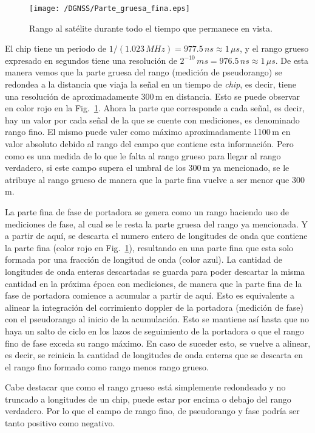 \documentclass[a4paper,12pt,oneside,onecolumn,final,openright]{book}%
\begin{document}
\begin{figure}
    \centering
    \texttt{[image: /DGNSS/Parte\_gruesa\_fina.eps]}
    \caption{Rango al satélite durante todo el tiempo que permanece en vista.}
    \label{fig:rrng_frng}
\end{figure}
	
	El chip tiene un periodo de $1/(1.023\,MHz) = 977.5\,ns \approx 1\,\mu s$, y el rango grueso expresado en segundos tiene una resolución de $2^{-10}\,ms = 976.5\,ns \approx 1\, \mu s$. De esta manera vemos que la parte gruesa del rango (medición de pseudorango) se redondea a la distancia que viaja la señal en un tiempo de \textit{chip}, es decir, tiene una resolución de aproximadamente 300\,m en distancia. Esto se puede observar en color rojo en la Fig.~\ref{fig:rrng_frng}. Ahora la parte que corresponde a cada señal, es decir, hay un valor por cada señal de la que se cuente con mediciones, es denominado rango fino. El mismo puede valer como máximo aproximadamente 1100\,m en valor absoluto debido al rango del campo que contiene esta información. Pero como es una medida de lo que le falta al rango grueso para llegar al rango verdadero, si este campo supera el umbral de los 300\,m ya mencionado, se le atribuye al rango grueso de manera que la parte fina vuelve a ser menor que 300\,m.
	
	La parte fina de fase de portadora se genera como un rango haciendo uso de mediciones de fase, al cual se le resta la parte gruesa del rango ya mencionada. Y a partir de aquí, se descarta el numero entero de longitudes de onda que contiene la parte fina (color rojo en Fig.~\ref{fig:rrng_frng}), resultando en una parte fina que esta solo formada por una fracción de longitud de onda (color azul). La cantidad de longitudes de onda enteras descartadas se guarda para poder descartar la misma cantidad en la próxima época con mediciones, de manera que la parte fina de la fase de portadora comience a acumular a partir de aquí. Esto es equivalente a alinear la integración del corrimiento doppler de la portadora (medición de fase) con el pseudorango al inicio de la acumulación. Esto se mantiene así hasta que no haya un salto de ciclo en los lazos de seguimiento de la portadora o que el rango fino de fase exceda su rango máximo. En caso de suceder esto, se vuelve a alinear, es decir, se reinicia la cantidad de longitudes de onda enteras que se descarta en el rango fino formado como rango menos rango grueso. 
	
	Cabe destacar que como el rango grueso está simplemente redondeado y no truncado a longitudes de un chip, puede estar por encima o debajo del rango verdadero. Por lo que el campo de rango fino, de pseudorango y fase podría ser tanto positivo como negativo.
	
\end{document}
